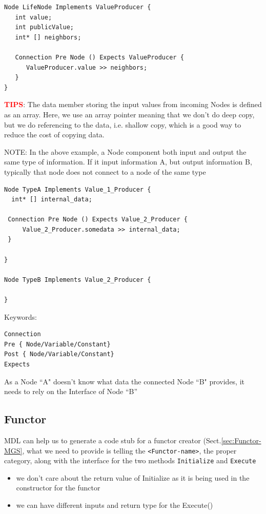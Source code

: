 \begin{verbatim}
Node LifeNode Implements ValueProducer {
   int value;
   int publicValue;
   int* [] neighbors;

   Connection Pre Node () Expects ValueProducer {
      ValueProducer.value >> neighbors;
   }
}
\end{verbatim}

\textcolor{red}{\bf TIPS}: The data member storing the input values from
incoming Nodes is defined as an array. Here, we use an array pointer meaning
that we don't do deep copy, but we do referencing to the data, i.e. shallow
copy, which is a good way to reduce the cost of copying data.

NOTE: In the above example, a Node component both input and output the same type
of information. If it input information A, but output information B, typically
that node does not connect to a node of the same type
\begin{verbatim}
Node TypeA Implements Value_1_Producer {
  int* [] internal_data;

 Connection Pre Node () Expects Value_2_Producer {
     Value_2_Producer.somedata >> internal_data;
 }

}

Node TypeB Implements Value_2_Producer {

}
\end{verbatim}

Keywords:
\begin{verbatim}
Connection
Pre { Node/Variable/Constant}
Post { Node/Variable/Constant}
Expects
\end{verbatim}

  As a Node ``A" doesn't know what data the connected Node ``B" provides, it
  needs to rely on the Interface of Node ``B'' 

  
\subsection{Functor}
\label{sec:Functor-in-MDL}


MDL can help us to generate a code stub for a functor creator
(Sect.\ref{sec:Functor-MGS}, what we need to provide is telling the
\verb!<Functor-name>!, the proper category, along with the interface for the two
methods \verb!Initialize! and \verb!Execute!
\begin{itemize}
  \item we don't care about the return value of Initialize as it is being used
  in the constructor for the functor
   
  \item we can have different inputs and return type for the Execute()
\end{itemize}

